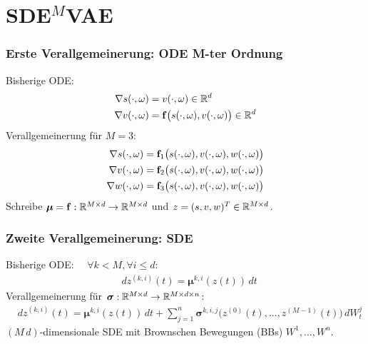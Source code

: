 

\author[Ben Deitmar]{Nix}




\section{SDE$^M$VAE}

\begin{frame}
	\frametitle{Erste Verallgemeinerung: ODE M-ter Ordnung}
	Bisherige ODE:
	\begin{align*}
	\nabla s(\cdot,\omega) &= v(\cdot,\omega) \in \mathbb{R}^d\\
	\nabla v(\cdot,\omega) &= \bold{f}\big(s(\cdot,\omega),v(\cdot,\omega)\big) \in \mathbb{R}^d
	\end{align*}
	Verallgemeinerung für $M=3$:
	\begin{align*}
	\nabla s(\cdot,\omega) &= \bold{f}_1\big(s(\cdot,\omega),v(\cdot,\omega),w(\cdot,\omega)\big)\\
	\nabla v(\cdot,\omega) &= \bold{f}_2\big(s(\cdot,\omega),v(\cdot,\omega),w(\cdot,\omega)\big)\\
	\nabla w(\cdot,\omega) &= \bold{f}_3\big(s(\cdot,\omega),v(\cdot,\omega),w(\cdot,\omega)\big)
	\end{align*}
	Schreibe $\bm{\mu} = \bold{f} : \mathbb{R}^{M \times d} \rightarrow \mathbb{R}^{M \times d}$ und $z = (s,v,w)^T \in \mathbb{R}^{M \times d}$.
\end{frame}


\begin{frame}
	\frametitle{Zweite Verallgemeinerung: SDE}
	Bisherige ODE: \ \ $\forall k < M, \forall i \leq d :$
	\begin{align*}
	 & d z^{(k,i)}(t) = \bm{\mu}^{k,i}(z(t)) \, dt
	\end{align*}
	Verallgemeinerung für $\bm{\sigma} : \mathbb{R}^{M \times d} \rightarrow \mathbb{R}^{M \times d \times n}$:
	\begin{align*}
	& d z^{(k,i)}(t) = \bm{\mu}^{k,i}(z(t)) \, dt + \sum\limits_{j=1}^n \bm{\sigma}^{k,i,j}\big(z^{(0)}(t),...,z^{(M-1)}(t)\big) \, dW^j_t
	\end{align*}
	 $(M \, d)$-dimensionale SDE mit Brownschen Bewegungen (BBs) $W^1,...,W^n$.
\end{frame}


